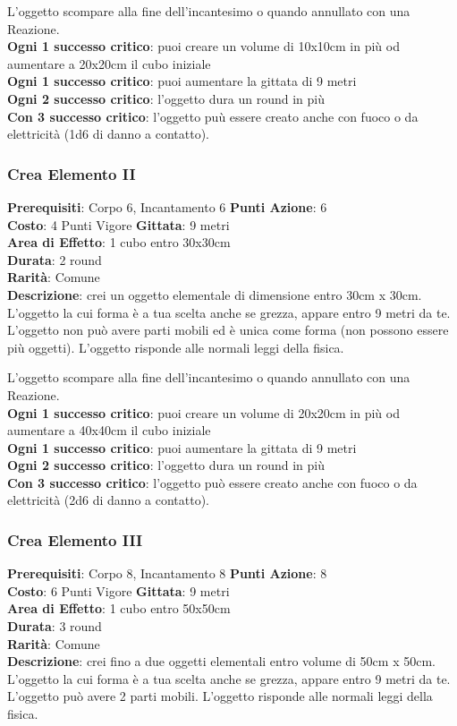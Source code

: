 \documentclass[12pt,a4paper,twoside,openany]{book}
\begin{document}
\begin{multicols}{2}
L'oggetto scompare alla fine dell'incantesimo o quando annullato con una Reazione.\\
\textbf{Ogni 1 successo critico}: puoi creare un volume di 10x10cm in più od aumentare a 20x20cm il cubo iniziale\\
\textbf{Ogni 1 successo critico}: puoi aumentare la gittata di 9 metri\\
\textbf{Ogni 2 successo critico}: l'oggetto dura un round in più\\
\textbf{Con 3 successo critico}: l'oggetto puù essere creato anche con fuoco o da elettricità (1d6 di danno a contatto).


\subsubsection*{Crea Elemento II}
\textbf{Prerequisiti}: Corpo 6, Incantamento 6
\textbf{Punti Azione}: 6\\
\textbf{Costo}: 4 Punti Vigore
\textbf{Gittata}: 9 metri\\
\textbf{Area di Effetto}: 1 cubo entro 30x30cm\\
\textbf{Durata}: 2 round\\
\textbf{Rarità}: Comune\\
\textbf{Descrizione}: crei un oggetto elementale di dimensione entro 30cm x 30cm.
L'oggetto la cui forma è a tua scelta anche se grezza, appare entro 9 metri da te. 
L'oggetto non può avere parti mobili ed è unica come forma (non possono essere più oggetti). L'oggetto risponde alle normali leggi della fisica.

L'oggetto scompare alla fine dell'incantesimo o quando annullato con una Reazione.\\
\textbf{Ogni 1 successo critico}: puoi creare un volume di 20x20cm in più od aumentare a 40x40cm il cubo iniziale\\
\textbf{Ogni 1 successo critico}: puoi aumentare la gittata di 9 metri\\
\textbf{Ogni 2 successo critico}: l'oggetto dura un round in più\\
\textbf{Con 3 successo critico}: l'oggetto può essere creato anche con fuoco o da elettricità (2d6 di danno a contatto).

\subsubsection*{Crea Elemento III}
\textbf{Prerequisiti}: Corpo 8, Incantamento 8
\textbf{Punti Azione}: 8\\
\textbf{Costo}: 6 Punti Vigore
\textbf{Gittata}: 9 metri\\
\textbf{Area di Effetto}: 1 cubo entro 50x50cm\\
\textbf{Durata}: 3 round\\
\textbf{Rarità}: Comune\\
\textbf{Descrizione}: crei fino a due oggetti elementali entro volume di 50cm x 50cm.
L'oggetto la cui forma è a tua scelta anche se grezza, appare entro 9 metri da te. 
L'oggetto può avere 2 parti mobili. L'oggetto risponde alle normali leggi della fisica.


\end{multicols}
\end{document}
